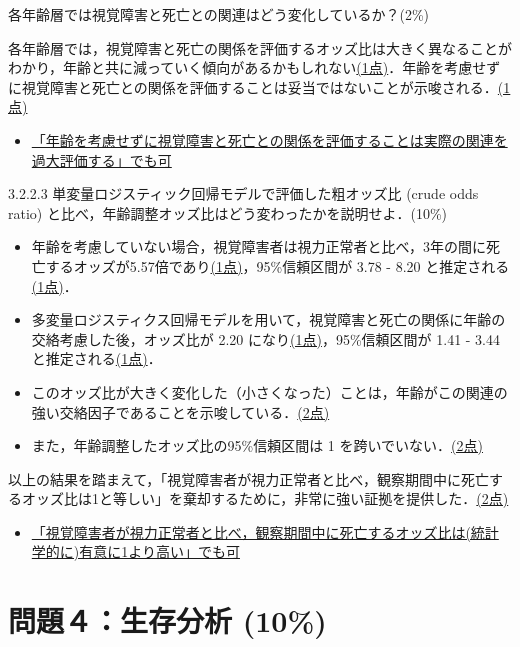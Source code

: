 \documentclass[11pt,]{problemset}
\begin{document}
各年齢層では視覚障害と死亡との関連はどう変化しているか？(2\%)

各年齢層では，視覚障害と死亡の関係を評価するオッズ比は大きく異なることがわかり，年齢と共に減っていく傾向があるかもしれない\underline{(1点)}．年齢を考慮せずに視覚障害と死亡との関係を評価することは妥当ではないことが示唆される．\underline{(1点)}

\begin{itemize}
\item
  \underline{「年齢を考慮せずに視覚障害と死亡との関係を評価することは実際の関連を過大}\newline\underline{評価する」でも可}
  \bigskip\bigskip\bigskip\bigskip\bigskip
\end{itemize}

3.2.2.3 単変量ロジスティック回帰モデルで評価した粗オッズ比 (crude odds
ratio) と比べ，年齢調整オッズ比はどう変わったかを説明せよ．(10\%)

\begin{itemize}
\item
  年齢を考慮していない場合，視覚障害者は視力正常者と比べ，3年の間に死亡するオッズが5.57倍であり\underline{(1点)}，95\%信頼区間が
  3.78 - 8.20 と推定される\underline{(1点)}．
\item
  多変量ロジスティクス回帰モデルを用いて，視覚障害と死亡の関係に年齢の交絡考慮した後，オッズ比が
  2.20 になり\underline{(1点)}，95\%信頼区間が 1.41 - 3.44
  と推定される\underline{(1点)}．
\item
  このオッズ比が大きく変化した（小さくなった）ことは，年齢がこの関連の強い交絡因子であることを示唆している．\underline{(2点)}
\item
  また，年齢調整したオッズ比の95\%信頼区間は 1
  を跨いでいない．\underline{(2点)}
\end{itemize}

以上の結果を踏まえて，「視覚障害者が視力正常者と比べ，観察期間中に死亡するオッズ比は1と等しい」を棄却するために，非常に強い証拠を提供した．\underline{(2点)}

\begin{itemize}
\item
  \underline{「視覚障害者が視力正常者と比べ，観察期間中に死亡するオッズ比は(統計学的に)}\newline\underline{有意に1より高い」でも可}
\end{itemize}

\hypertarget{-10}{%
\section{問題４：生存分析 (10\%)}\label{-10}}
\end{document}
